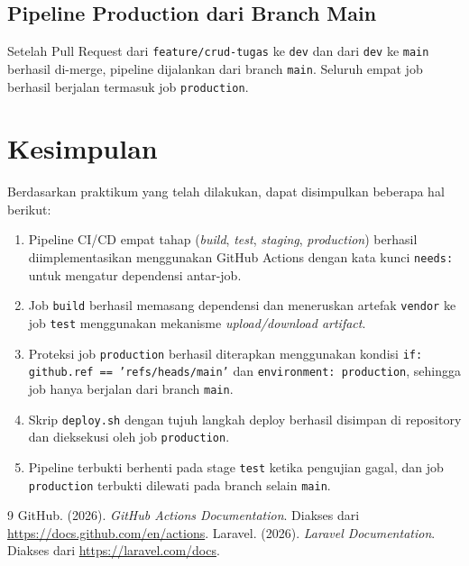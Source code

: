 \documentclass[a4paper,oneside,11pt]{book}
\begin{document}
\section{Pipeline Production dari Branch Main}

Setelah Pull Request dari \texttt{feature/crud-tugas} ke \texttt{dev} dan dari \texttt{dev} ke \texttt{main} berhasil di-merge, pipeline dijalankan dari branch \texttt{main}. Seluruh empat job berhasil berjalan termasuk job \texttt{production}.


\chapter{Kesimpulan}

Berdasarkan praktikum yang telah dilakukan, dapat disimpulkan beberapa hal berikut:
\begin{enumerate}
    \item Pipeline CI/CD empat tahap (\textit{build}, \textit{test}, \textit{staging}, \textit{production}) berhasil diimplementasikan menggunakan GitHub Actions dengan kata kunci \texttt{needs:} untuk mengatur dependensi antar-job.
    \item Job \texttt{build} berhasil memasang dependensi dan meneruskan artefak \texttt{vendor} ke job \texttt{test} menggunakan mekanisme \textit{upload/download artifact}.
    \item Proteksi job \texttt{production} berhasil diterapkan menggunakan kondisi \texttt{if: github.ref == 'refs/heads/main'} dan \texttt{environment: production}, sehingga job hanya berjalan dari branch \texttt{main}.
    \item Skrip \texttt{deploy.sh} dengan tujuh langkah deploy berhasil disimpan di repository dan dieksekusi oleh job \texttt{production}.
    \item Pipeline terbukti berhenti pada stage \texttt{test} ketika pengujian gagal, dan job \texttt{production} terbukti dilewati pada branch selain \texttt{main}.
\end{enumerate}

\clearpage

\begin{thebibliography}{9}
GitHub. (2026). \textit{GitHub Actions Documentation}. Diakses dari \url{https://docs.github.com/en/actions}.
Laravel. (2026). \textit{Laravel Documentation}. Diakses dari \url{https://laravel.com/docs}.
\end{thebibliography}
\end{document}
